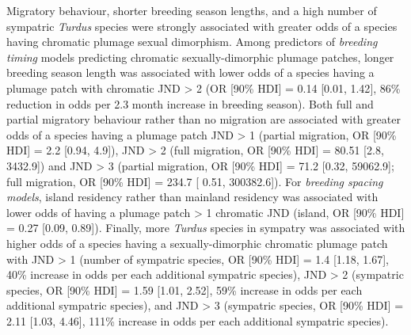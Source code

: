 \documentclass[
  a4paper,
]{article}
\begin{document}
Migratory behaviour, shorter breeding season lengths, and a high number
of sympatric \emph{Turdus} species were strongly associated with greater
odds of a species having chromatic plumage sexual dimorphism. Among
predictors of \emph{breeding timing} models predicting chromatic
sexually-dimorphic plumage patches, longer breeding season length was
associated with lower odds of a species having a plumage patch with
chromatic JND \textgreater{} 2 (OR {[}90\% HDI{]} = 0.14 {[}0.01,
1.42{]}, 86\% reduction in odds per 2.3 month increase in breeding
season). Both full and partial migratory behaviour rather than no
migration are associated with greater odds of a species having a plumage
patch JND \textgreater{} 1 (partial migration, OR {[}90\% HDI{]} = 2.2
{[}0.94, 4.9{]}), JND \textgreater{} 2 (full migration, OR {[}90\%
HDI{]} = 80.51 {[}2.8, 3432.9{]}) and JND \textgreater{} 3 (partial
migration, OR {[}90\% HDI{]} = 71.2 {[}0.32, 59062.9{]}; full migration,
OR {[}90\% HDI{]} = 234.7 {[} 0.51, 300382.6{]}). For \emph{breeding
spacing models}, island residency rather than mainland residency was
associated with lower odds of having a plumage patch \textgreater{} 1
chromatic JND (island, OR {[}90\% HDI{]} = 0.27 {[}0.09, 0.89{]}).
Finally, more \emph{Turdus} species in sympatry was associated with
higher odds of a species having a sexually-dimorphic chromatic plumage
patch with JND \textgreater{} 1 (number of sympatric species, OR {[}90\%
HDI{]} = 1.4 {[}1.18, 1.67{]}, 40\% increase in odds per each additional
sympatric species), JND \textgreater{} 2 (sympatric species, OR {[}90\%
HDI{]} = 1.59 {[}1.01, 2.52{]}, 59\% increase in odds per each
additional sympatric species), and JND \textgreater{} 3 (sympatric
species, OR {[}90\% HDI{]} = 2.11 {[}1.03, 4.46{]}, 111\% increase in
odds per each additional sympatric species).
\end{document}
